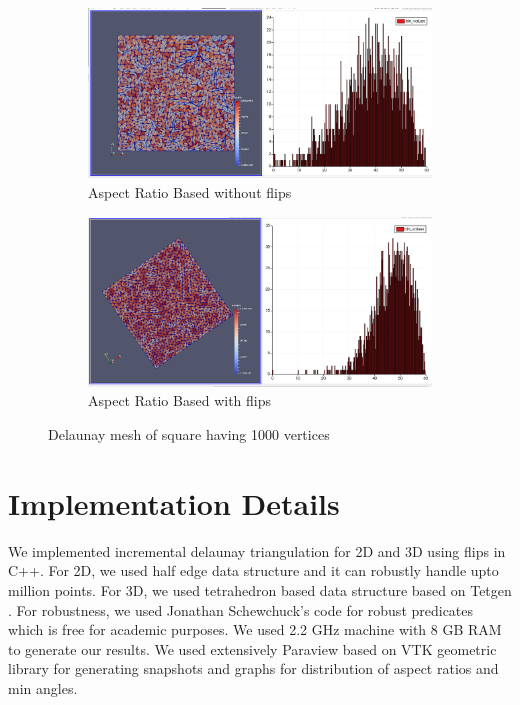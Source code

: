 \begin{figure}[h]
	\ContinuedFloat
    \centering
   	\begin{subfigure}[h]{1.0\textwidth}
        \centering
        \includegraphics[width=\textwidth]{images/aspect_ratio_no_flips_1000.png}
        \caption{Aspect Ratio Based without flips}
    \end{subfigure}
	\vspace{0.5 cm}
   
    \begin{subfigure}[h]{1.0\textwidth}
        \centering
        \includegraphics[width=\textwidth]{images/aspect_ratio_1000.png}
        \caption{Aspect Ratio Based with flips}    
    \end{subfigure}	  	
    \caption{Delaunay mesh of square having 1000 vertices}
    \label{fig:points_1000}
\end{figure}

\section{Implementation Details}
We implemented incremental delaunay triangulation for 2D and 3D using flips in C++. For 2D, we used half edge data structure and it can robustly handle upto million points.
For 3D, we used tetrahedron based data structure based on Tetgen \cite{tetgen}. For robustness, we used Jonathan Schewchuck's code for robust predicates which is free for academic purposes. We used 2.2 GHz machine with 8 GB RAM to generate our results. We used extensively Paraview based on VTK geometric library for generating  snapshots and graphs for distribution of aspect ratios and min angles.